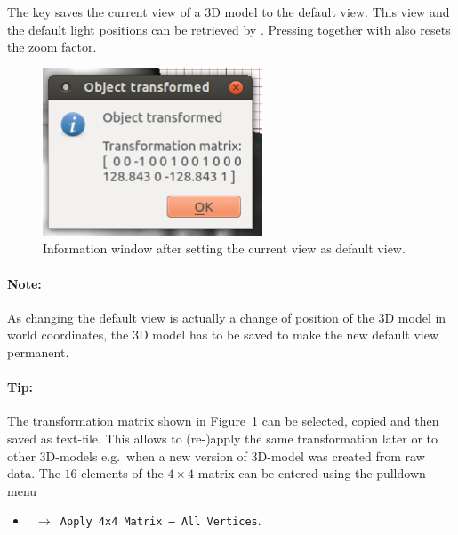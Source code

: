 The key \! saves the current view of a 3D model to the default view.
This view and the default light positions can be retrieved by \!\!. Pressing \!\Shift together with \! also resets the zoom factor.
\begin{figure}[!hbt]
	\centering
	\includegraphics[height=50mm]{figs/gigamesh_gui_object_transformed}
	\caption{Information window after setting the current view as default view.}
	\label{fig:objecttransformed}
\end{figure}

\paragraph{Note:} As changing the default view is actually a change of position of the 3D model in world coordinates, 
the 3D model has to be saved to make the new default view permanent. 

\paragraph{Tip:} The transformation matrix shown in Figure~\ref{fig:objecttransformed} can be selected, copied and then saved as text-file. 
This allows to (re-)apply the same transformation later or to other 3D-models e.g.~when a new version of 3D-model was created from raw data.
The $16$ elements of the $4\times4$ matrix can be entered using the pulldown-menu
\begin{itemize}
	\item[] \texttt{ $\rightarrow$ Apply 4x4 Matrix -- All Vertices}.
\end{itemize}

